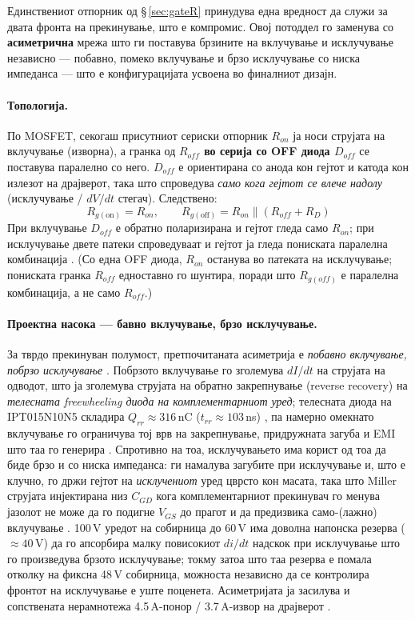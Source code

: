 \documentclass[11pt,a4paper]{article}
\newcommand{\eng}[1]{\textenglish{#1}}
\begin{document}
Единствениот отпорник од \S\,\ref{sec:gateR} принудува една вредност да служи за двата фронта на прекинување, што е компромис. Овој потоддел го заменува со \textbf{асиметрична} мрежа што ги поставува брзините на вклучување и исклучување независно --- побавно, помеко вклучување и брзо исклучување со ниска импеданса --- што е конфигурацијата усвоена во финалниот дизајн.

\paragraph{Топологија.} По MOSFET, секогаш присутниот сериски отпорник \textbf{$R_{on}$} ја носи струјата на вклучување (изворна), а гранка од \textbf{$R_{off}$ во серија со OFF диода $D_{off}$} се поставува паралелно со него. $D_{off}$ е ориентирана со анода кон гејтот и катода кон излезот на драјверот, така што спроведува \emph{само кога гејтот се влече надолу} (исклучување / $dV/dt$ стегач). Следствено:
\begin{equation}
R_{g(\text{on})} = R_{on}, \qquad R_{g(\text{off})} = R_{on} \parallel (R_{off} + R_{D})
\end{equation}
При вклучување $D_{off}$ е обратно поларизирана и гејтот гледа само $R_{on}$; при исклучување двете патеки спроведуваат и гејтот ја гледа пониската паралелна комбинација \cite{ref5,ref12}. (Со една OFF диода, $R_{on}$ останува во патеката на исклучување; пониската гранка $R_{off}$ едноставно го шунтира, поради што $R_{g(off)}$ е паралелна комбинација, а не само $R_{off}$.)

\paragraph{Проектна насока --- бавно вклучување, брзо исклучување.} За тврдо прекинуван полумост, претпочитаната асиметрија е \emph{побавно вклучување, побрзо исклучување} \cite{ref12,ref13,ref14}. Побрзото вклучување го зголемува $dI/dt$ на струјата на одводот, што ја зголемува струјата на обратно закрепнување (\eng{reverse recovery}) на \emph{телесната \eng{freewheeling} диода на комплементарниот уред}; телесната диода на IPT015N10N5 складира $Q_{rr}\approx 316$\,nC ($t_{rr}\approx 103$\,ns) \cite{ref1}, па намерно омекнато вклучување го ограничува тој врв на закрепнување, придружната загуба и EMI што таа го генерира \cite{ref12,ref13}. Спротивно на тоа, исклучувањето има корист од тоа да биде брзо и со ниска импеданса: ги намалува загубите при исклучување и, што е клучно, го држи гејтот на \emph{исклучениот} уред цврсто кон масата, така што \eng{Miller} струјата инјектирана низ $C_{GD}$ кога комплементарниот прекинувач го менува јазолот не може да го подигне $V_{GS}$ до прагот и да предизвика само-(лажно) вклучување \cite{ref13,ref14}. 100\,V уредот на собирница до 60\,V има доволна напонска резерва ($\approx 40$\,V) да го апсорбира малку повисокиот $di/dt$ надскок при исклучување што го произведува брзото исклучување; токму затоа што таа резерва е помала отколку на фиксна 48\,V собирница, можноста независно да се контролира фронтот на исклучување е уште поценета. Асиметријата ја засилува и сопствената нерамнотежа 4.5\,A-понор / 3.7\,A-извор на драјверот \cite{ref3}.
\end{document}
